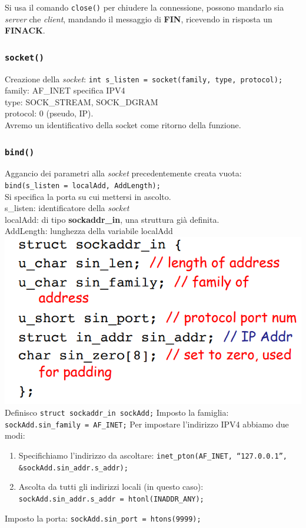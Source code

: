 Si usa il comando \texttt{close()} per chiudere la connessione, possono mandarlo sia \textit{server} che \textit{client}, mandando il messaggio di \textbf{FIN}, ricevendo in risposta un \textbf{FINACK}. 

\subsubsection*{\texttt{socket()}}
Creazione della \textit{socket}: \texttt{int s\_listen = socket(family, type, protocol);} \\ 
family: AF\_INET specifica IPV4 \\ type: SOCK\_STREAM, SOCK\_DGRAM \\ protocol: 0 (pseudo, IP). \\
Avremo un identificativo della socket come ritorno della funzione. 

\subsubsection*{\texttt{bind()}}
Aggancio dei parametri alla \textit{socket} precedentemente creata vuota: \\ 
\texttt{bind(s\_listen = localAdd, AddLength);} \\
Si specifica la porta su cui mettersi in ascolto. \\ 
s\_listen: identificatore della \textit{socket} \\ 
localAdd: di tipo \textbf{sockaddr\_in}, una struttura già definita. \\ 
AddLength: lunghezza della variabile localAdd \\ 
\includegraphics[width=\textwidth]{./img/struct_sockaddr_In.png} \\

Definisco \texttt{struct sockaddr\_in sockAdd;}
Imposto la famiglia: \texttt{sockAdd.sin\_family = AF\_INET;}
Per impostare l'indirizzo IPV4 abbiamo due modi:
\begin{enumerate}
  \item Specifichiamo l'indirizzo da ascoltare: \texttt{inet\_pton(AF\_INET, “127.0.0.1”, \&sockAdd.sin\_addr.s\_addr);}
  \item Ascolta da tutti gli indirizzi locali (in questo caso): \texttt{sockAdd.sin\_addr.s\_addr = htonl(INADDR\_ANY);}
\end{enumerate}
Imposto la porta: \texttt{sockAdd.sin\_port = htons(9999);}

